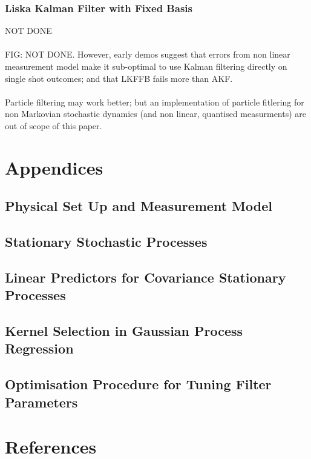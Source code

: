 \subsubsection{Liska Kalman Filter with Fixed Basis}
NOT DONE
\\
\\
FIG: NOT DONE. However, early demos suggest that errors from non linear measurement model make it sub-optimal to use Kalman filtering directly on single shot outcomes; and that  LKFFB fails more than AKF. 
\\
\\
Particle filtering may work better; but an implementation of particle fitlering for non Markovian stochastic dynamics (and non linear, quantised  measurments) are out of scope of this paper. 

\section{Appendices}
\subsection{Physical Set Up and Measurement Model}
\subsection{Stationary Stochastic Processes }
\subsection{Linear Predictors for Covariance Stationary Processes}
\subsection{Kernel Selection in Gaussian Process Regression}
\subsection{Optimisation Procedure for Tuning Filter Parameters}

\section{References}